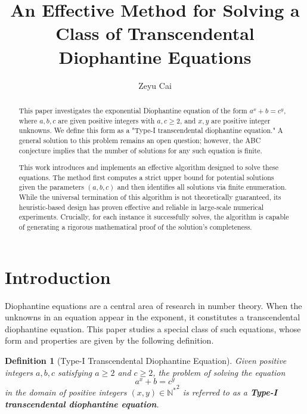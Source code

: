 \documentclass{article}
\title{\textbf{An Effective Method for Solving a Class of Transcendental Diophantine Equations}}
\author{Zeyu Cai}
\date{} %
\newtheorem{definition}[theorem]{Definition}
\begin{document}
\maketitle

\begin{abstract}
This paper investigates the exponential Diophantine equation of the form $a^x+b=c^y$, where $a, b, c$ are given positive integers with $a,c \ge 2$, and $x,y$ are positive integer unknowns. We define this form as a "Type-I transcendental diophantine equation." A general solution to this problem remains an open question; however, the ABC conjecture implies that the number of solutions for any such equation is finite.

This work introduces and implements an effective algorithm designed to solve these equations. The method first computes a strict upper bound for potential solutions given the parameters $(a, b, c)$ and then identifies all solutions via finite enumeration. While the universal termination of this algorithm is not theoretically guaranteed, its heuristic-based design has proven effective and reliable in large-scale numerical experiments. Crucially, for each instance it successfully solves, the algorithm is capable of generating a rigorous mathematical proof of the solution's completeness.
\end{abstract}

\section{Introduction}
\label{sec:introduction}

Diophantine equations are a central area of research in number theory. When the unknowns in an equation appear in the exponent, it constitutes a transcendental diophantine equation. This paper studies a special class of such equations, whose form and properties are given by the following definition.

\begin{definition}[Type-I Transcendental Diophantine Equation]
\label{def:main_equation}
Given positive integers $a, b, c$ satisfying $a \ge 2$ and $c \ge 2$, the problem of solving the equation
\begin{equation}
    a^x+b=c^y
    \label{eq:main}
\end{equation}
in the domain of positive integers $(x, y) \in \mathbb{N^*}^2$ is referred to as a \textbf{Type-I transcendental diophantine equation}.
\end{definition}
\end{document}
